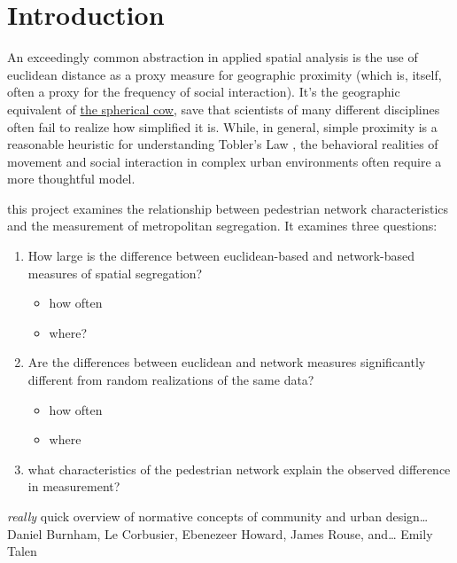 \documentclass[
  10pt,
]{article}
\providecommand{\tightlist}{%
  \setlength{\itemsep}{0pt}\setlength{\parskip}{0pt}}
\begin{document}
\setlength{\parindent}{16pt}
\setlength{\parskip}{0pt}

\hypertarget{introduction}{%
\section{Introduction}\label{introduction}}

An exceedingly common abstraction in applied spatial analysis is the use
of euclidean distance as a proxy measure for geographic proximity (which
is, itself, often a proxy for the frequency of social interaction). It's
the geographic equivalent of
\href{https://en.wikipedia.org/wiki/Spherical_cow}{the spherical cow},
save that scientists of many different disciplines often fail to realize
how simplified it is. While, in general, simple proximity is a
reasonable heuristic for understanding Tobler's Law
\citep{tobler1970ComputerMovie}, the behavioral realities of movement
and social interaction in complex urban environments often require a
more thoughtful model.

this project examines the relationship between pedestrian network
characteristics and the measurement of metropolitan segregation. It
examines three questions:

\begin{enumerate}
\def\labelenumi{\arabic{enumi}.}
\tightlist
\item
  How large is the difference between euclidean-based and network-based
  measures of spatial segregation?

  \begin{itemize}
  \tightlist
  \item
    how often
  \item
    where?
  \end{itemize}
\item
  Are the differences between euclidean and network measures
  significantly different from random realizations of the same data?

  \begin{itemize}
  \tightlist
  \item
    how often
  \item
    where
  \end{itemize}
\item
  what characteristics of the pedestrian network explain the observed
  difference in measurement?
\end{enumerate}

\emph{really} quick overview of normative concepts of community and
urban design\ldots{} Daniel Burnham, Le Corbusier, Ebenezeer Howard,
James Rouse, and\ldots{} Emily Talen
\end{document}
